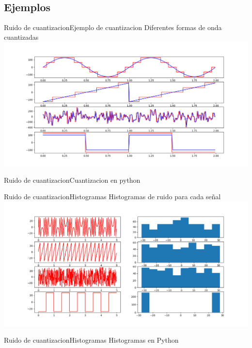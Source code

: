 \begin{darkframes}
      \subsection{Ejemplos}
      \begin{frame}{Ruido de cuantizacion}{Ejemplo de cuantizacion}
         Diferentes formas de onda cuantizadas
         \center\includegraphics[width=1\textwidth]{1_clase/noise_examples}
         \vfill
      \end{frame}
      \begin{frame}{Ruido de cuantizacion}{Cuantizacion en python}
         \handsonicon
         
         \vfill
      \end{frame}
      \begin{frame}{Ruido de cuantizacion}{Histogramas}
         Histogramas de ruido para cada señal
         \center\includegraphics[width=1\textwidth]{1_clase/noise_histogram}
         \vfill
      \end{frame}
      \begin{frame}{Ruido de cuantizacion}{Histogramas}
         Histogramas en Python
         \handsonicon
         
         \vfill
      \end{frame}

\end{darkframes}
